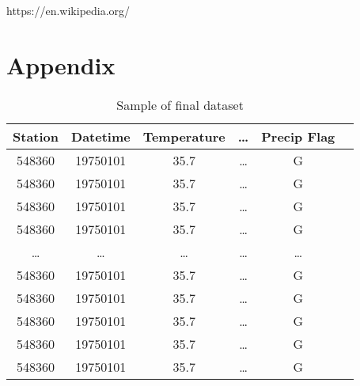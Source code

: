 \documentclass[conference]{IEEEtran}
\begin{document}
https://en.wikipedia.org/

\section{Appendix}

\begin{table}[h!]
\centering
 \begin{tabular}{||c c c c c c||}
 \hline
  Station& Datetime &Temperature & \dots & Precip Flag \\ [0.5ex]
 \hline\hline
 548360 & 19750101 & 35.7 & \dots & G \\
 548360 & 19750101 & 35.7 & \dots & G \\
 548360 & 19750101 & 35.7 & \dots & G \\
 548360 & 19750101 & 35.7 & \dots & G \\
 \dots & \dots & \dots & \dots & \dots \\
 548360 & 19750101 & 35.7 & \dots & G \\
 548360 & 19750101 & 35.7 & \dots & G \\
 548360 & 19750101 & 35.7 & \dots & G \\
 548360 & 19750101 & 35.7 & \dots & G \\
 548360 & 19750101 & 35.7 & \dots & G \\[1ex]

 \hline
 \end{tabular}
 \caption{Sample of final dataset}
\end{table}
\end{document}
